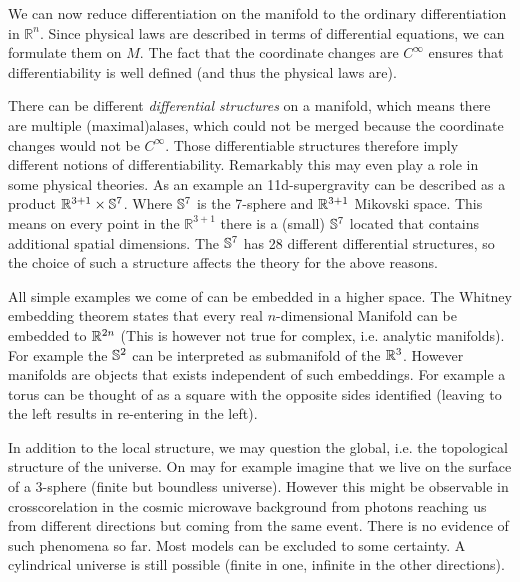 We can now reduce differentiation on the manifold to the ordinary differentiation in $\mathbb{R}^n$. 
Since physical laws are described in terms of differential equations, we can formulate them on $M$. 
The fact that the coordinate changes are $C^\infty$ ensures that differentiability is well defined (and thus the physical laws are).

\begin{sidenote}
There can be different \emph{differential structures} on a manifold, 
which means there are multiple (maximal)alases, which
could not be merged because the coordinate changes would not be $C^\infty$. Those differentiable structures therefore imply different notions of differentiability. 
Remarkably this may even play a role in some physical theories. 
As an example an 11d-supergravity can be described as a product
$\mathbb{R}^{3+1}\times \mathbb{S}^7$.
Where $\mathbb{S}^7$ is the 7-sphere and $\mathbb{R}^{3+1}$ Mikovski space.
This means on every point in the $\mathbb{R}^{3+1}$ there is a (small) $\mathbb{S}^7$  located that contains additional spatial dimensions. 
The $\mathbb{S}^7$ has 28 different differential structures, so the choice of
such a structure affects the theory for the above reasons.
\end{sidenote}
All simple examples we come of can be embedded in a higher space. The Whitney
embedding theorem states that every real $n$-dimensional Manifold
can be embedded to $\mathbb{R}^{2n}$ (This is however not true for complex, i.e. analytic manifolds).
For example the $\mathbb{S}^2$ can be interpreted as submanifold of the $\mathbb{R}^3$.
However manifolds are objects that exists independent of such embeddings. 
For example a torus can be thought of as a square with the opposite sides identified (leaving to the left results in re-entering in the left).
\begin{sidenote}
In addition to the local structure, we may question the global, i.e. the
topological structure of the universe.
On may for example imagine that we live on the surface of a 3-sphere (finite but boundless universe). 
However this might be observable in crosscorelation in the cosmic microwave background from photons reaching us 
from different directions but coming from the same event. There is no evidence of such phenomena so far. 
Most models can be excluded to some certainty. A cylindrical
universe is still possible (finite in one, infinite in the
other directions).
\end{sidenote}
